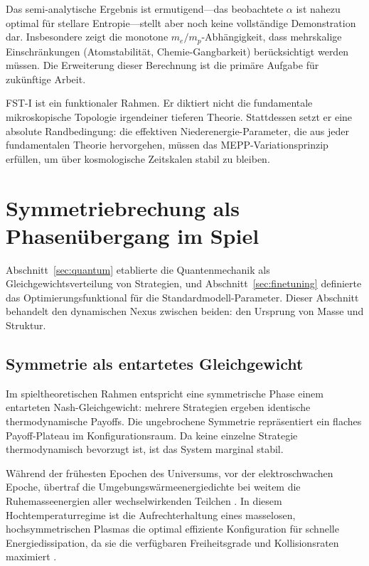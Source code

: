 \documentclass[12pt,a4paper]{article}
\theoremstyle{remark}
\begin{document}
Das semi-analytische Ergebnis ist ermutigend---das beobachtete $\alpha$ ist nahezu optimal f\"ur stellare Entropie---stellt aber noch keine vollst\"andige Demonstration dar. Insbesondere zeigt die monotone $m_e/m_p$-Abh\"angigkeit, dass mehrskalige Einschr\"ankungen (Atomstabilit\"at, Chemie-Gangbarkeit) ber\"ucksichtigt werden m\"ussen. Die Erweiterung dieser Berechnung ist die prim\"are Aufgabe f\"ur zuk\"unftige Arbeit.

FST-I ist ein funktionaler Rahmen. Er diktiert nicht die fundamentale mikroskopische Topologie irgendeiner tieferen Theorie. Stattdessen setzt er eine absolute Randbedingung: die effektiven Niederenergie-Parameter, die aus jeder fundamentalen Theorie hervorgehen, m\"ussen das MEPP-Variationsprinzip erf\"ullen, um \"uber kosmologische Zeitskalen stabil zu bleiben.

\section{Symmetriebrechung als Phasen\"ubergang im Spiel}
\label{sec:symmetry}

Abschnitt~\ref{sec:quantum} etablierte die Quantenmechanik als Gleichgewichtsverteilung von Strategien, und Abschnitt~\ref{sec:finetuning} definierte das Optimierungsfunktional f\"ur die Standardmodell-Parameter. Dieser Abschnitt behandelt den dynamischen Nexus zwischen beiden: den Ursprung von Masse und Struktur.

\subsection{Symmetrie als entartetes Gleichgewicht}

Im spieltheoretischen Rahmen entspricht eine symmetrische Phase einem entarteten Nash-Gleichgewicht: mehrere Strategien ergeben identische thermodynamische Payoffs. Die ungebrochene Symmetrie repr\"asentiert ein flaches Payoff-Plateau im Konfigurationsraum. Da keine einzelne Strategie thermodynamisch bevorzugt ist, ist das System marginal stabil.

W\"ahrend der fr\"uhesten Epochen des Universums, vor der elektroschwachen Epoche, \"ubertraf die Umgebungsw\"armeenergiedichte bei weitem die Ruhemasseenergien aller wechselwirkenden Teilchen \citep{HiggsVEV}. In diesem Hochtemperaturregime ist die Aufrechterhaltung eines masselosen, hochsymmetrischen Plasmas die optimal effiziente Konfiguration f\"ur schnelle Energiedissipation, da sie die verf\"ugbaren Freiheitsgrade und Kollisionsraten maximiert \citep{HiggsVEV2024}.
\end{document}
